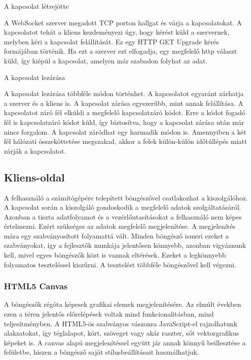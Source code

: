 \documentclass[bibliography=totocnumbered]{article}
\begin{document}
A kapcsolat létrejötte

A WebSocket szerver megadott TCP porton hallgat és várja a
kapcsolatokat. A kapcsolatot tehát a kliens kezdeményezi úgy, hogy
kérést küld a szervernek, melyben kéri a kapcsolat felállítását. Ez egy
HTTP GET Upgrade kérés formájában történik. Ha ezt a szerver ezt
elfogadja, egy megfelelő http választ küld, így kiépül a kapcsolat,
amelyen már szabadon folyhat az adat.

A kapcsolat lezárása

A kapcsolat lezárása többféle módon történhet. A kapcsolatot egyaránt
zárhatja a szerver és a kliens is. A kapcsolat zárása egyszerűbb, mint
annak felállítása. A kapcsolatot záró fél elküldi a megfelelő
kapcsolatzáró kódot. Erre a kódot fogadó fél is kapcsolatzáró kódot
küld, így biztosítva, hogy a kapcsolat zárása után már nincs forgalom. A
kapcsolat záródhat egy harmadik módon is. Amennyiben a két fél hálózati
összeköttetése megszakad, akkor a felek külön-külön időtúllépés miatt
zárják a kapcsolatot.


\subsection{Kliens-oldal}

A felhasználó a számítógépére telepített böngészővel csatlakozhat a
kiszolgálóhoz. A kapcsolat során a kiszolgáló gondoskodik a megfelelő
adatok szolgáltatásáról. Azonban a tiszta adatfolyamot és a
vezérlőutasításokat a felhasználó nem képes értelmezni. Ezért szükséges
az adatok megfelelő megjelenítése. A megjelenítés mára egy
szabványosított folyamattá vált. Minden böngésző ismeri ezeket a
szabványokat, így a fejlesztők munkája jelentősen könnyebb, azonban
vigyáznunk kell, mivel egyes böngészők közt is vannak eltérések. Ezeket
a legkönnyebb folyamatos teszteléssel kiszűrni. A tesztelést többféle
böngészővel kell végezni.


\subsubsection{HTML5 Canvas}

A böngészők régóta képesek grafikai elemek megjelenítésére. Az elmúlt
években ezen a téren jelentős előrelépések voltak mind
funkcionalitásban, mind teljesítményben. A HTML5-ös szabványos vászonra
JavaScript-el rajzolhatunk alakzatokat, így téglalapot, kört, szöveget
vagy akár raszter, sőt vektorgrafikus képeket is. A canvas alapú
megjelenítéssel együtt jár annak könnyű beillesztése a felületbe, hiszen
a böngésző saját stílusbeállításait használhatjuk.
\end{document}
